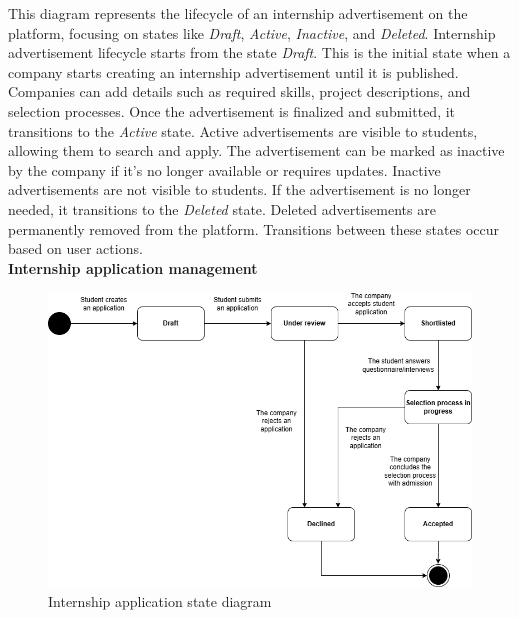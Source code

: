 This diagram represents the lifecycle of an internship advertisement on the platform, focusing on states like \textit{Draft}, \textit{Active}, \textit{Inactive}, and \textit{Deleted}. Internship advertisement lifecycle starts from the state \textit{Draft}. This is the initial state when a company starts creating an internship advertisement until it is published. Companies can add details such as required skills, project descriptions, and selection processes. Once the advertisement is finalized and submitted, it transitions to the \textit{Active} state. Active advertisements are visible to students, allowing them to search and apply. The advertisement can be marked as inactive by the company if it's no longer available or requires updates. Inactive advertisements are not visible to students. If the advertisement is no longer needed, it transitions to the \textit{Deleted} state. Deleted advertisements are permanently removed from the platform. Transitions between these states occur based on user actions.\\

\textbf{Internship application management}\\
\begin{figure}[H]
	\includegraphics[width=\textwidth,height=\textheight,keepaspectratio]{RASD-Latex/assets/state_diagram_2.png}
	\caption{Internship application state diagram}
	\label{fig:DataRequest}
\end{figure}

